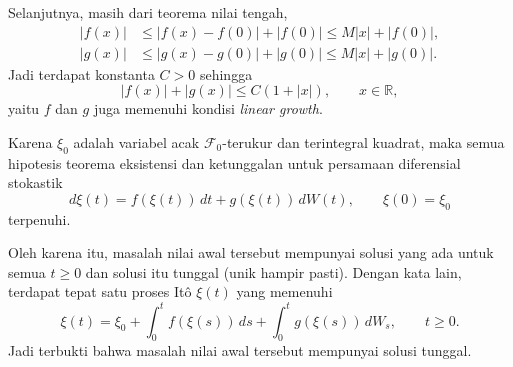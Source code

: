 \documentclass[11pt,a4paper]{article}
\newcommand{\R}{\mathbb{R}}
\newcommand{\F}{\mathcal{F}}
\begin{document}
\begin{enumerate}[leftmargin=*, itemsep=0.6cm]
        Selanjutnya, masih dari teorema nilai tengah,
        \begin{align*}
          |f(x)|
           & \le |f(x)-f(0)|+|f(0)|
          \le M|x|+|f(0)|,\\
          |g(x)|
           & \le |g(x)-g(0)|+|g(0)|
          \le M|x|+|g(0)|.
        \end{align*}
        Jadi terdapat konstanta $C>0$ sehingga
        \[
          |f(x)|+|g(x)|\le C(1+|x|),\qquad x\in\R,
        \]
        yaitu $f$ dan $g$ juga memenuhi kondisi \textit{linear growth}.

        Karena $\xi_0$ adalah variabel acak $\F_0$-terukur dan terintegral kuadrat, maka semua
        hipotesis teorema eksistensi dan ketunggalan untuk persamaan diferensial stokastik
        \[
          d\xi(t)=f(\xi(t))\,dt+g(\xi(t))\,dW(t),\qquad \xi(0)=\xi_0
        \]
        terpenuhi.

        Oleh karena itu, masalah nilai awal tersebut mempunyai solusi yang ada untuk semua
        $t\ge 0$ dan solusi itu tunggal (unik hampir pasti). Dengan kata lain, terdapat tepat
        satu proses It\^o $\xi(t)$ yang memenuhi
        \[
          \xi(t)=\xi_0+\int_0^t f(\xi(s))\,ds+\int_0^t g(\xi(s))\,dW_s,
          \qquad t\ge 0.
        \]
        Jadi terbukti bahwa masalah nilai awal tersebut mempunyai solusi tunggal.
\end{enumerate}
\end{document}
